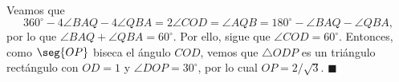 Veamos que 
\[ 360^\circ-4\angle BAQ -4\angle QBA = 2\angle COD = \angle AQB = 180^\circ-\angle BAQ -\angle QBA, \]
por lo que $\angle BAQ +\angle QBA=60^\circ$. Por ello, sigue que $\angle COD = 60^\circ$. Entonces, como $\seg{OP}$ biseca el ángulo $COD$, vemos que $\triangle ODP$ es un triángulo rectángulo con $OD=1$ y $\angle DOP=30^\circ$, por lo cual $OP=2/\sqrt3$. $\blacksquare$
